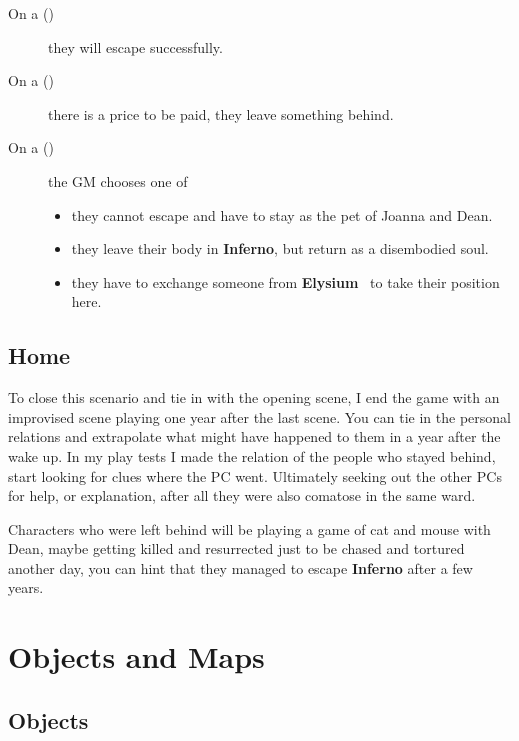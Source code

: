 \documentclass[bg-full]{resources/stylesheets/kult}
\begin{document}
\begin{description}
  \item[On a ()] they will escape successfully.
  \item[On a ()] there is a price to be paid, they leave something behind.
  \item[On a ()] the GM chooses one of
        \begin{itemize}[noitemsep]
          \item they cannot escape and have to stay as the pet of Joanna and Dean.
          \item they leave their body in \textbf{Inferno}, but return as a disembodied soul.
          \item they have to exchange someone from \textbf{Elysium}~\cite[p.~224]{KULT:core} to take their position here.
        \end{itemize}
\end{description}

\subsection{Home}%
\label{sub:home}

To close this scenario and tie in with the opening scene, I end the game with an improvised scene playing one year after the
last scene.  You can tie in the personal relations and extrapolate what might have happened to them in a year after the wake up.
In my play tests I made the relation of the people who stayed behind, start looking for clues where the PC went.  Ultimately
seeking out the other PCs for help, or explanation, after all they were also comatose in the same ward.

Characters who were left behind will be playing a game of cat and mouse with Dean, maybe getting killed and
resurrected just to be chased and tortured another day, you can hint that they managed to escape \textbf{Inferno} after a few
years.

\clearpage %
\section{Objects and Maps}%
\label{sec:objects_and_maps}

\twocolumn
\subsection{Objects}%
\label{sub:objects}
\end{document}
